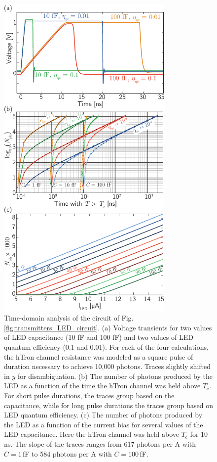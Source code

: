 \documentclass[twocolumn]{article}
\begin{document}
\begin{figure}%
	\centerline{\includegraphics[width=8.6cm]{_transmitters_LED_data_small.pdf}}
	\caption{\label{fig:transmitters_LED_data}Time-domain analysis of the circuit of Fig. \ref{fig:transmitters_LED_circuit}. (a) Voltage transients for two values of LED capacitance (10 fF and 100 fF) and two values of LED quantum efficiency (0.1 and 0.01). For each of the four calculations, the hTron channel resistance was modeled as a square pulse of duration necessary to achieve 10,000 photons. Traces slightly shifted in $y$ for disambiguation. (b) The number of photons produced by the LED as a function of the time the hTron channel was held above $T_{\mathrm{c}}$. For short pulse durations, the traces group based on the capacitance, while for long pulse durations the traces group based on LED quantum efficiency. (c) The number of photons produced by the LED as a function of the current bias for several values of the LED capacitance. Here the hTron channel was held above $T_{\mathrm{c}}$ for 10\,ns. The slope of the traces ranges from 617 photons per \textmu A with $C = 1$\,fF to 584 photons per \textmu A with $C = 100$\,fF. }
\end{figure}
\end{document}
